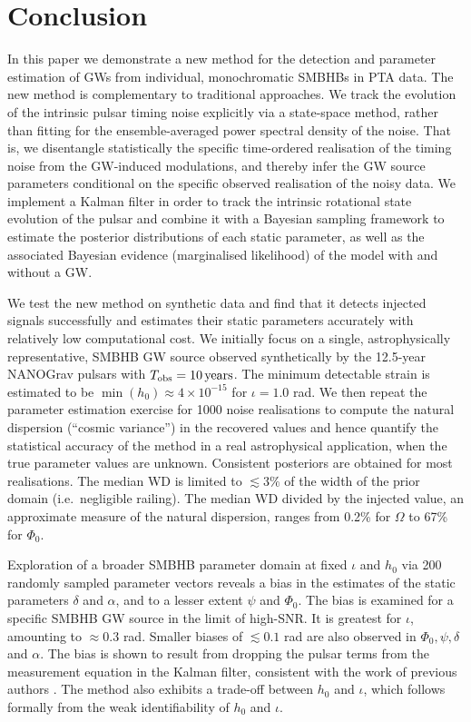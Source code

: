 \documentclass[fleqn,usenatbib,useAMS]{mnras}
\begin{document}
\section{Conclusion}\label{sec:discussion}

In this paper we demonstrate a new method for the detection and parameter estimation of GWs from individual, monochromatic SMBHBs in PTA data. The new method is complementary to traditional approaches. We track the evolution of the intrinsic pulsar timing noise explicitly via a state-space method, rather than fitting for the ensemble-averaged power spectral density of the noise. That is, we disentangle statistically the specific time-ordered realisation of the timing noise from the GW-induced modulations, and thereby infer the GW source parameters conditional on the specific observed realisation of the noisy data. We implement a Kalman filter in order to track the intrinsic rotational state evolution of the pulsar and combine it with a Bayesian sampling framework to estimate the posterior distributions of each static parameter, as well as the associated Bayesian evidence (marginalised likelihood) of the model with and without a GW. \newline 
 
 We test the new method on synthetic data and find that it detects injected signals successfully and estimates their static parameters accurately with relatively low computational cost. We initially focus on a single, astrophysically representative, SMBHB GW source observed synthetically by the 12.5-year NANOGrav pulsars with $T_{\rm obs} = 10 \, {\rm years}$. The minimum detectable strain is estimated to be $\min(h_0) \approx 4 \times 10^{-15}$ for $\iota=1.0$ rad. We then repeat the parameter estimation exercise for 1000 noise realisations to compute the natural dispersion (``cosmic variance'') in the recovered values and hence quantify the statistical accuracy of the method in a real astrophysical application, when the true parameter values are unknown. Consistent posteriors are obtained for most realisations. The median WD is limited to $\lesssim 3\%$ of the width of the prior domain (i.e.\ negligible railing). The median WD divided by the injected value, an approximate measure of the natural dispersion, ranges from  0.2\% for $\Omega$ to 67\% for $\Phi_0$. \newline 
  
  
Exploration of a broader SMBHB parameter domain at fixed $\iota$ and $h_0$ via 200 randomly sampled parameter vectors reveals a bias in the estimates of the static parameters $\delta$ and $\alpha$, and to a lesser extent $\psi$ and $\Phi_0$. The bias is examined for a specific SMBHB GW source in the limit of high-SNR. It is greatest for $\iota$, amounting to $\approx 0.3$ rad.  Smaller biases of $\lesssim 0.1$ rad are also observed in $\Phi_0, \psi, \delta$ and $\alpha$. The bias is shown to result from dropping the pulsar terms from the measurement equation in the Kalman filter, consistent with the work of previous authors \citep{Zhupulsarterms,Chen2022}. The method also exhibits a trade-off between $h_0$ and $\iota$, which follows formally from the weak identifiability of $h_0$ and $\iota$. \newline 
 
\end{document}
